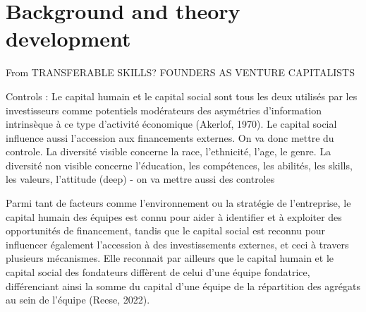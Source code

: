 \documentclass[11pt]{article}
\begin{document}
\section{Background and theory development}


























From TRANSFERABLE SKILLS? FOUNDERS AS VENTURE CAPITALISTS







Controls : Le capital humain et le capital social sont tous les deux utilisés par les investisseurs comme potentiels modérateurs des asymétries d'information intrinsèque à ce type d'activité économique (Akerlof, 1970). Le capital social influence aussi l'accession aux financements externes. On va donc mettre du controle. La diversité visible concerne la race, l'ethnicité, l'age, le genre. La diversité non visible concerne l'éducation, les compétences, les abilités, les skills, les valeurs, l'attitude (deep) - on va mettre aussi des controles


Parmi tant de facteurs comme l'environnement ou la stratégie de l'entreprise, le capital humain des équipes est connu pour aider à identifier et à exploiter des opportunités de financement, tandis que le capital social est reconnu pour influencer également l'accession à des investissements externes, et ceci à travers plusieurs mécanismes. Elle reconnait par ailleurs que le capital humain et le capital social des fondateurs diffèrent de celui d'une équipe fondatrice, différenciant ainsi la somme du capital d'une équipe de la répartition des agrégats au sein de l'équipe (Reese, 2022).
\end{document}
